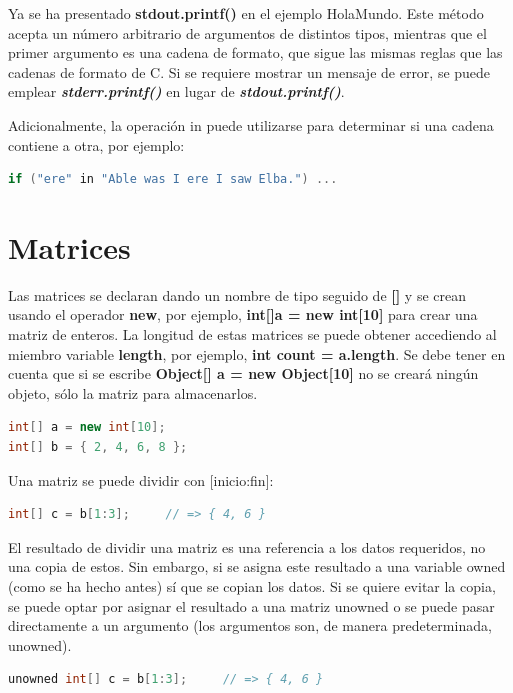 \documentclass[12pt,twoside]{book}
\begin{document}
Ya se ha presentado \textbf{stdout.printf()} en el ejemplo HolaMundo. Este método acepta un número arbitrario de argumentos de distintos tipos, mientras que el primer argumento es una cadena de formato, que sigue las mismas reglas que las cadenas de formato de C. Si se requiere mostrar un mensaje de error, se puede emplear \textbf{\textit{stderr.printf()}} en lugar de \textbf{\textit{stdout.printf()}}.

Adicionalmente, la operación in puede utilizarse para determinar si una cadena contiene a otra, por ejemplo:

\begin{lstlisting}[language=C++]
if ("ere" in "Able was I ere I saw Elba.") ...
\end{lstlisting}


\section{Matrices}

Las matrices se declaran dando un nombre de tipo seguido de \textbf{[]} y se crean usando el operador \textbf{new}, por ejemplo, \textbf{int[]a = new int[10]} para crear una matriz de enteros. La longitud de estas matrices se puede obtener accediendo al miembro variable \textbf{length}, por ejemplo, \textbf{int count = a.length}. Se debe tener en cuenta que si se escribe \textbf{Object[] a = new Object[10]} no se creará ningún objeto, sólo la matriz para almacenarlos.

\begin{lstlisting}[language=C++]
int[] a = new int[10];
int[] b = { 2, 4, 6, 8 };
\end{lstlisting}

Una matriz se puede dividir con [inicio:fin]:

\begin{lstlisting}[language=C++]
int[] c = b[1:3];     // => { 4, 6 }
\end{lstlisting}

El resultado de dividir una matriz es una referencia a los datos requeridos, no una copia de estos. Sin embargo, si se asigna este resultado a una variable owned (como se ha hecho antes) sí que se copian los datos. Si se quiere evitar la copia, se puede optar por asignar el resultado a una matriz unowned o se puede pasar directamente a un argumento (los argumentos son, de manera predeterminada, unowned).

\begin{lstlisting}[language=C++]
unowned int[] c = b[1:3];     // => { 4, 6 }
\end{lstlisting}
\end{document}
